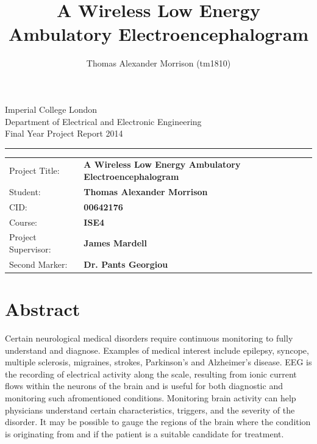 \documentclass[]{article}
\title{A Wireless  Low Energy Ambulatory Electroencephalogram}
\author{Thomas Alexander Morrison (tm1810)}
\begin{document}
\maketitle

\begin{titlepage}
\setlength{\parindent}{0pt}
\setlength{\parskip}{0pt}

{
\Large
\raggedright
Imperial College London\\[17pt]
Department of Electrical and Electronic Engineering\\[17pt]
Final Year Project Report 2014\\[17pt]

}
\rule{\columnwidth}{3pt}

\vfill

\centering

\vfill

\setlength{\tabcolsep}{0pt}
\begin{tabular}{p{40mm}p{\dimexpr\columnwidth-40mm}}
Project Title: & \textbf{A Wireless  Low Energy Ambulatory Electroencephalogram} \\[12pt]
Student: & \textbf{Thomas Alexander Morrison} \\[12pt]
CID: & \textbf{00642176} \\[12pt]
Course: & \textbf{ISE4} \\[12pt]
Project Supervisor: & \textbf{James Mardell} \\[12pt]
Second Marker: & \textbf{Dr. Pants Georgiou} \\
\end{tabular}
\end{titlepage}

\clearpage





\clearpage

\section*{Abstract}
Certain neurological medical disorders require continuous monitoring to fully understand and diagnose. Examples of medical interest include epilepsy, syncope, multiple sclerosis, migraines, strokes, Parkinson’s and Alzheimer’s disease. \ac{EEG} is the recording of electrical activity along the scale, resulting from ionic current flows within the neurons of the brain and is useful for both diagnostic and monitoring such afromentioned conditions. Monitoring brain activity can help physicians understand certain characteristics, triggers, and the severity of the disorder. It may be possible to gauge the regions of the brain where the condition is originating from and if the patient is a suitable candidate for treatment. 
\end{document}
